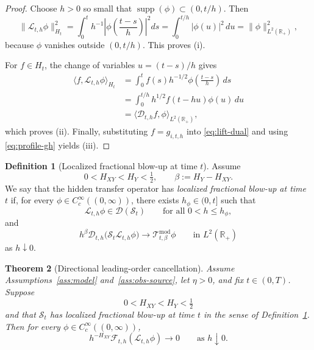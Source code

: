 \documentclass[11pt,a4paper]{amsart}
\theoremstyle{plain}
\newtheorem{theorem}{Theorem}[section]
\theoremstyle{definition}
\newtheorem{definition}[theorem]{Definition}
\theoremstyle{remark}
\newcommand{\R}{\mathbb{R}}
\begin{document}
\begin{proof}
Choose $h>0$ so small that $\operatorname{supp}(\phi)\subset(0,t/h)$. Then
\[
\|\mathcal L_{t,h}\phi\|_{H_t}^2
=
\int_0^t h^{-1}\left|\phi\!\left(\frac{t-s}{h}\right)\right|^2ds
=
\int_0^{t/h} |\phi(u)|^2\,du
=
\|\phi\|_{L^2(\R_+)}^2,
\]
because $\phi$ vanishes outside $(0,t/h)$. This proves (i).

For $f\in H_t$, the change of variables $u=(t-s)/h$ gives
\begin{align*}
\langle f,\mathcal L_{t,h}\phi\rangle_{H_t}
&=
\int_0^t f(s)h^{-1/2}\phi\!\left(\frac{t-s}{h}\right)\,ds \\
&=
\int_0^{t/h} h^{1/2}f(t-hu)\phi(u)\,du \\
&=
\langle \mathcal D_{t,h}f,\phi\rangle_{L^2(\R_+)},
\end{align*}
which proves (ii). Finally, substituting $f=g_{i,t,h}$ into \eqref{eq:lift-dual} and using
\eqref{eq:profile-gh} yields (iii).
\end{proof}

\begin{definition}[Localized fractional blow-up at time $t$]
\label{def:localized-blowup}
Assume
\[
0<H_{XY}<H_Y<\tfrac12,
\qquad
\beta:=H_Y-H_{XY}.
\]
We say that the hidden transfer operator has \emph{localized fractional blow-up at time $t$}
if, for every $\phi\in C_c^\infty((0,\infty))$, there exists $h_\phi\in(0,t]$ such that
\[
\mathcal L_{t,h}\phi\in\mathcal D(\mathcal S_t)
\qquad\text{for all }0<h\le h_\phi,
\]
and
\begin{equation}\label{eq:localized-blowup}
h^{\beta}\mathcal D_{t,h}\bigl(\mathcal S_t\mathcal L_{t,h}\phi\bigr)
\longrightarrow
\mathcal T_{t,\beta}^{\mathrm{mod}}\phi
\qquad\text{in }L^2(\R_+)
\end{equation}
as $h\downarrow0$.
\end{definition}

\begin{theorem}[Directional leading-order cancellation]\label{thm:directional-cancel}
Assume Assumptions~\ref{ass:model} and~\ref{ass:obs-source}, let $\eta>0$, and fix
$t\in(0,T)$. Suppose
\[
0<H_{XY}<H_Y<\tfrac12
\]
and that $\mathcal S_t$ has localized fractional blow-up at time $t$ in the sense of
Definition~\ref{def:localized-blowup}. Then for every $\phi\in C_c^\infty((0,\infty))$,
\begin{equation}\label{eq:directional-cancel}
h^{-H_{XY}}\mathcal F_{t,h}(\mathcal L_{t,h}\phi)
\longrightarrow 0
\qquad\text{as }h\downarrow0.
\end{equation}
\end{theorem}
\end{document}
